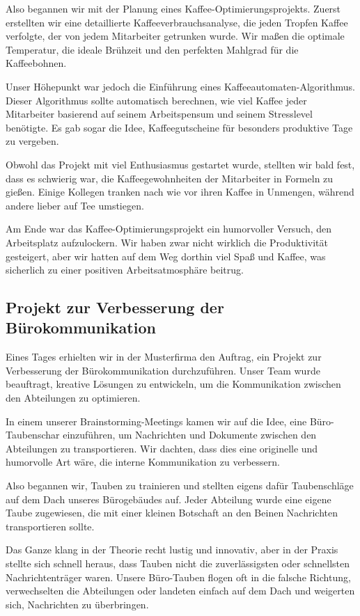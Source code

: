 Also begannen wir mit der Planung eines Kaffee-Optimierungsprojekts. Zuerst erstellten wir eine detaillierte Kaffeeverbrauchsanalyse, die jeden Tropfen Kaffee verfolgte, der von jedem Mitarbeiter getrunken wurde. Wir maßen die optimale Temperatur, die ideale Brühzeit und den perfekten Mahlgrad für die Kaffeebohnen.

Unser Höhepunkt war jedoch die Einführung eines Kaffeeautomaten-Algorithmus. Dieser Algorithmus sollte automatisch berechnen, wie viel Kaffee jeder Mitarbeiter basierend auf seinem Arbeitspensum und seinem Stresslevel benötigte. Es gab sogar die Idee, Kaffeegutscheine für besonders produktive Tage zu vergeben.

Obwohl das Projekt mit viel Enthusiasmus gestartet wurde, stellten wir bald fest, dass es schwierig war, die Kaffeegewohnheiten der Mitarbeiter in Formeln zu gießen. Einige Kollegen tranken nach wie vor ihren Kaffee in Unmengen, während andere lieber auf Tee umstiegen.

Am Ende war das Kaffee-Optimierungsprojekt ein humorvoller Versuch, den Arbeitsplatz aufzulockern. Wir haben zwar nicht wirklich die Produktivität gesteigert, aber wir hatten auf dem Weg dorthin viel Spaß und Kaffee, was sicherlich zu einer positiven Arbeitsatmosphäre beitrug.

\subsection{Projekt zur Verbesserung der Bürokommunikation}

Eines Tages erhielten wir in der Musterfirma den Auftrag, ein Projekt zur Ver\-besserung der Bürokommunikation durchzuführen. Unser Team wurde beauftragt, kreative Lösungen zu entwickeln, um die Kommunikation zwischen den Abteilungen zu optimieren.

In einem unserer Brainstorming-Meetings kamen wir auf die Idee, eine Büro-Tauben\-schar einzuführen, um Nachrichten und Dokumente zwischen den Abteilungen zu transportieren. Wir dachten, dass dies eine originelle und humorvolle Art wäre, die interne Kommunikation zu verbessern.

Also begannen wir, Tauben zu trainieren und stellten eigens dafür Taubenschläge auf dem Dach unseres Bürogebäudes auf. Jeder Abteilung wurde eine eigene Taube zugewiesen, die mit einer kleinen Botschaft an den Beinen Nachrichten transportieren sollte.

Das Ganze klang in der Theorie recht lustig und innovativ, aber in der Praxis stellte sich schnell heraus, dass Tauben nicht die zuverlässigsten oder schnellsten Nachrichtenträger waren. Unsere Büro-Tauben flogen oft in die falsche Richtung, verwechselten die Abteilungen oder landeten einfach auf dem Dach und weigerten sich, Nachrichten zu überbringen.

